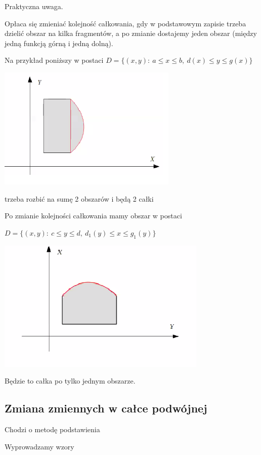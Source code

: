 Praktyczna uwaga.

Opłaca się zmieniać kolejność całkowania, gdy w podstawowym zapisie trzeba dzielić obszar na kilka fragmentów, a po zmianie dostajemy jeden
obszar (między jedną funkcją górną i jedną dolną).
\begin{przyklad}
    Na przykład poniższy w postaci $ D = \{(x,y): \ a \leq x \leq b, \ d(x) \leq y \leq g(x) \} $
    
    \includegraphics[scale=0.65]{img/obszar1.png}

    trzeba rozbić na sumę 2 obszarów i będą 2 całki

    Po zmianie kolejności całkowania mamy obszar w postaci

    $ D = \{(x,y): \ c \leq y \leq d, \ d_1(y) \leq x \leq g_1(y) \} $

    \includegraphics[scale=0.6]{img/obszar2.png}

    Będzie to całka po tylko jednym obszarze.
\end{przyklad}

\subsection{Zmiana zmiennych w całce podwójnej}

Chodzi o metodę podstawienia

Wyprowadzamy wzory

